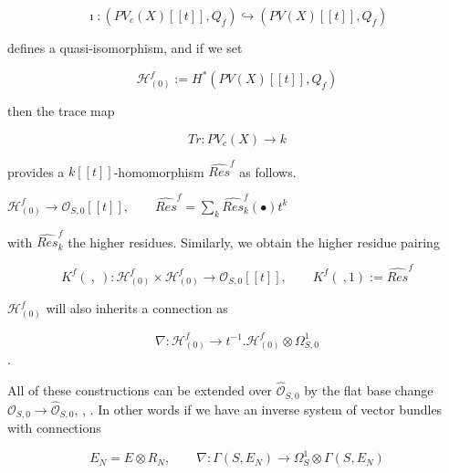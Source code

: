 \documentclass[12pt,twoside]{amsart}
\begin{document}
\[ \imath:(PV_c(X)[[t]], Q_f) \hookrightarrow (PV(X)[[t]], Q_f) \]

\vspace{0.5cm}

\noindent
defines a quasi-isomorphism, and if we set

\[ \mathcal{H}_{(0)}^f:=H^*(PV(X)[[t]], Q_f) \]

\vspace{0.5cm}

\noindent
then the trace map

\[ Tr:PV_c(X) \to k \]

\vspace{0.5cm}

\noindent
provides a $k[[t]]$-homomorphism $\widehat{Res}^f$ as follows.

\vspace{0.5cm}

\begin{center}

$\mathcal{H}_{(0)}^f \longrightarrow \mathcal{O}_{S,0}[[t]],  \qquad \widehat{Res}^f=\sum_k \widehat{Res}_k^f(\bullet)t^k $

\end{center}

\vspace{0.5cm}

\noindent
with $\widehat{Res}_k^f$ the higher residues. Similarly, we obtain the higher residue pairing 

\[ K^f( \ , \ ):\mathcal{H}_{(0)}^f \times \mathcal{H}_{(0)}^f \to \mathcal{O}_{S,0}[[t]], \qquad  K^f( \ , 1 ):=\widehat{Res}^f \]

\vspace{0.5cm}

\noindent
$\mathcal{H}_{(0)}^f$ will also inherits a connection as

\[ \nabla:\mathcal{H}_{(0)}^f \to t^{-1}.\mathcal{H}_{(0)}^f \otimes \Omega_{S,0}^1 \].

\vspace{0.5cm}

\noindent
All of these constructions can be extended over $\hat{\mathcal{O}}_{S,0}$ by the flat base change $\mathcal{O}_{S,0} \to \hat{\mathcal{O}}_{S,0}$, \cite{SA1}, \cite{LLS}. In other words if we have an inverse system of vector bundles with connections

\[ E_N =E \otimes R_N,\qquad  \nabla: \Gamma(S,E_N) \to \Omega_S^1 \otimes \Gamma(S,E_N)  \] 

\vspace{0.5cm}
\end{document}
